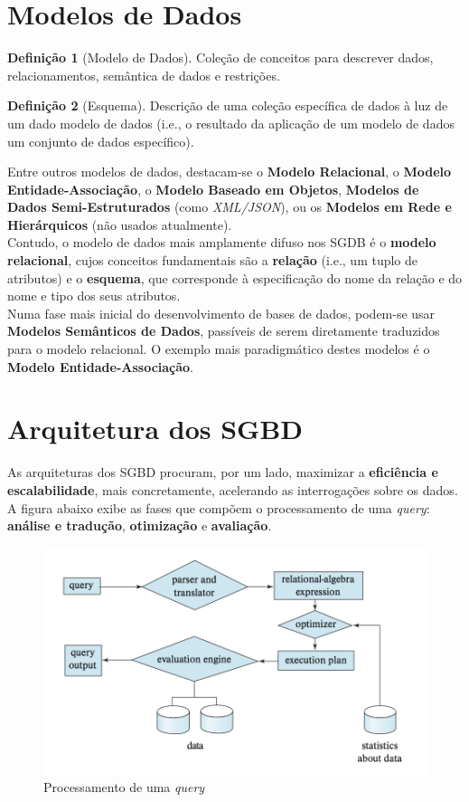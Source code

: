 \documentclass[oneside]{book}
\theoremstyle{definition}
\newtheorem{definition}{Definição}
\begin{document}
\section{Modelos de Dados}

\begin{definition}[Modelo de Dados]
    Coleção de conceitos para descrever dados, relacionamentos, semântica de dados e restrições.
\end{definition}
\begin{definition}[Esquema]
    Descrição de uma coleção específica de dados à luz de um dado modelo de dados (i.e., o resultado da aplicação de um modelo de dados um conjunto de dados específico).
\end{definition}

Entre outros modelos de dados, destacam-se o \textbf{Modelo Relacional}, o \textbf{Modelo Entidade-Associação}, o \textbf{Modelo Baseado em Objetos}, \textbf{Modelos de Dados Semi-Estruturados} (como \textit{XML/JSON}), ou os \textbf{Modelos em Rede e Hierárquicos} (não usados atualmente).\\
\indent Contudo, o modelo de dados mais amplamente difuso nos SGDB é o \textbf{modelo relacional}, cujos conceitos fundamentais são a \textbf{relação} (i.e., um tuplo de atributos) e o \textbf{esquema}, que corresponde à especificação do nome da relação e do nome e tipo dos seus atributos. \\
\indent Numa fase mais inicial do desenvolvimento de bases de dados, podem-se usar \textbf{Modelos Semânticos de Dados}, passíveis de serem diretamente traduzidos para o modelo relacional. O exemplo mais paradigmático destes modelos é o \textbf{Modelo Entidade-Associação}.

\section{Arquitetura dos SGBD}

As arquiteturas dos SGBD procuram, por um lado, maximizar a \textbf{eficiência e escalabilidade}, mais concretamente, acelerando as interrogações sobre os dados. A figura abaixo exibe as fases que compõem o processamento de uma \textit{query}: \textbf{análise e tradução}, \textbf{otimização} e  \textbf{avaliação}.

\begin{figure}[H]
    \centering
    \includegraphics[scale = 0.5]{cap1/arquitetura.png}
    \caption{Processamento de uma \textit{query}}
\end{figure}
\end{document}

